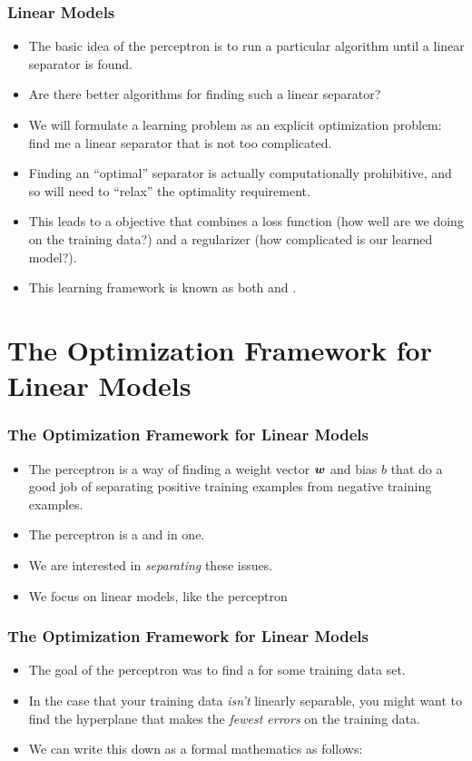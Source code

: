 \documentclass[trans]{beamer}
\begin{document}
\begin{frame}
  \frametitle{Linear Models}
\begin{itemize}
\item 
The basic idea of the perceptron is to run a particular algorithm
until a linear separator is found.  
\item Are there better
algorithms for finding such a linear separator?  
\item We will formulate a learning problem as an explicit optimization
problem: find me a linear separator that is not too complicated. 
\item Finding an ``optimal'' separator is actually
computationally prohibitive, and so will need to ``relax'' the
optimality requirement. 
\item  This leads to a 
objective that combines a loss function (how well are we doing on the
training data?) and a regularizer (how complicated is our learned
model?).  
\item This learning framework is known as both  and .
\end{itemize}
\end{frame}


\section{The Optimization Framework for Linear Models}
\begin{frame}
  \frametitle{The Optimization Framework for Linear Models}
\begin{itemize}
\item 
The perceptron is a way of finding a weight
vector ${\boldsymbol{w}}$ and bias $b$ that do a good job of separating positive
training examples from negative training examples. 
\item The perceptron is
a  and  in one. 
\item We are
interested in \emph{separating} these issues. 
\item  We focus on linear
models, like the perceptron
\end{itemize}
\end{frame}


\begin{frame}
  \frametitle{The Optimization Framework for Linear Models}
\begin{itemize}
\item 
The goal of the perceptron was to find a  for some training data set.  
\item  In the case that your training data
\emph{isn't} linearly separable, you might want to find the hyperplane
that makes the \emph{fewest errors} on the training data.  
\item We can
write this down as a formal mathematics 
as follows:
%
%
\end{itemize}
\end{frame}
\end{document}
